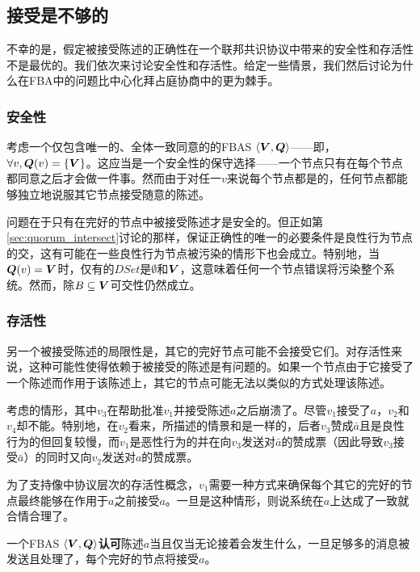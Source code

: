 \subsection{接受是不够的}
不幸的是，假定被接受陈述的正确性在一个联邦共识协议中带来的安全性和存活性不是最优的。我们依次来讨论安全性和存活性。给定一些情景，我们然后讨论为什么在FBA中的问题比中心化拜占庭协商中的更为棘手。

\subsubsection{安全性}\label{sec:voting_safety}
考虑一个仅包含唯一的、全体一致同意的{\quorum}的FBAS $\langle{\bm V},{\bm Q}\rangle$——即，$\forall v, {\bm Q}(v)=\left\{{\bm V}\right\}$。这应当是一个安全性的保守选择——一个节点只有在每个节点都同意之后才会做一件事。然而由于对任一$v$来说每个节点都是{\vblock}的，任何节点都能够独立地说服其它节点接受随意的陈述。

问题在于只有在完好的节点中被接受陈述才是安全的。但正如第\ref{sec:quorum_intersect}讨论的那样，保证正确性的唯一的必要条件是良性行为节点的{\quorum}交，这有可能在一些良性行为节点被污染的情形下也会成立。特别地，当${\bm Q}(v)={\bm V}$时，仅有的$DSet$是$\emptyset$和${\bm V}$，这意味着任何一个节点错误将污染整个系统。然而，除$B\subseteq{\bm V}${\quorum}可交性仍然成立。

\subsubsection{存活性}\label{sec:accept_not_enough_liveness}
另一个被接受陈述的局限性是，其它的完好节点可能不会接受它们。对存活性来说，这种可能性使得依赖于被接受的陈述是有问题的。如果一个节点由于它接受了一个陈述而作用于该陈述上，其它的节点可能无法以类似的方式处理该陈述。

考虑的情形，其中$v_3$在帮助批准$v_1$并接受陈述$a$之后崩溃了。尽管$v_1$接受了$a$，$v_2$和$v_4$却不能。特别地，在$v_2$看来，所描述的情景和是一样的，后者$v_3$赞成$\bar a$且是良性行为的但回复较慢，而$v_1$是恶性行为的并在向$v_3$发送对$\bar a$的赞成票（因此导致$v_3$接受$\bar a$）的同时又向$v_2$发送对$a$的赞成票。

为了支持像中协议层次的存活性概念，$v_1$需要一种方式来确保每个其它的完好的节点最终能够在作用于$a$之前接受$a$。一旦是这种情形，则说系统在$a$上达成了一致就合情合理了。

\begin{definition}[认可]\label{def:agree}
	一个FBAS $\langle{\bm V},{\bm Q}\rangle$\textbf{认可}陈述$a$当且仅当无论接着会发生什么，一旦足够多的消息被发送且处理了，每个完好的节点将接受$a$。
\end{definition}

